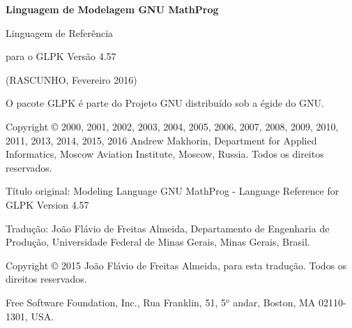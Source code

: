 \documentclass[11pt, brazil]{report}
\begin{document}
\thispagestyle{empty}

\begin{center}

\vspace*{1.5in}

\begin{huge}
\sf\bfseries Linguagem de Modelagem GNU MathProg
\end{huge}

\vspace{0.5in}

\begin{LARGE}
\sf Linguagem de Referência %
\end{LARGE}

\vspace{0.5in}

\begin{LARGE}
\sf para o GLPK Versão 4.57
\end{LARGE}

\vspace{0.5in}
\begin{Large}
\sf (RASCUNHO, Fevereiro 2016)
\end{Large}

\end{center}

\newpage

\vspace*{1in}

\vfill

\noindent
O pacote GLPK é parte do Projeto GNU distribuído sob a égide do GNU.

\noindent
Copyright \copyright{} 2000, 2001, 2002, 2003, 2004, 2005, 2006, 2007,
2008, 2009, 2010, 2011, 2013, 2014, 2015, 2016 Andrew Makhorin, Department
for Applied Informatics, Moscow Aviation Institute, Moscow, Russia.
Todos os direitos reservados.

\noindent
Título original: Modeling Language GNU MathProg - Language Reference for GLPK Version 4.57

\noindent
Tradução: João Flávio de Freitas Almeida, Departamento de Engenharia de Produção, Universidade Federal de Minas Gerais,
Minas Gerais, Brasil.

\noindent
Copyright \copyright{} 2015 João Flávio de Freitas Almeida, para esta tradução. Todos os direitos reservados.

\noindent
Free Software Foundation, Inc., Rua Franklin, 51, 5$^{o}$ andar, Boston,
MA 02110-1301, USA.
\end{document}
